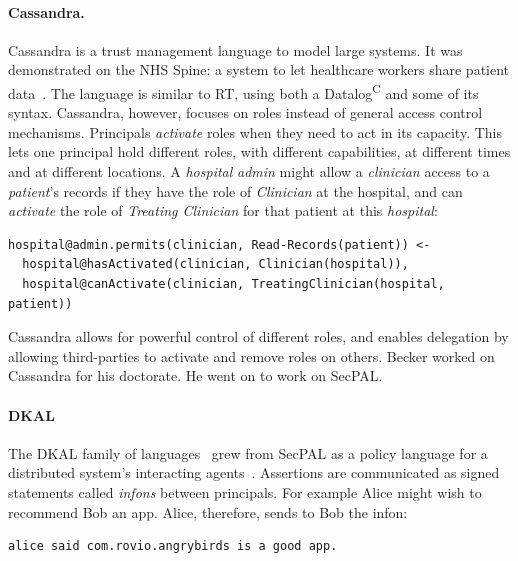 \documentclass[thesis.tex]{subfiles}
\begin{document}
\paragraph*{Cassandra.}
Cassandra is a trust management language to model large systems.
It was demonstrated on the NHS Spine: a system to let healthcare
workers share patient
data~\cite{becker_cassandra:_2004,becker_cassandra:_2004-1}.  The
language is similar to RT, using both a Datalog\textsuperscript{C} and some
of its syntax. Cassandra, however, focuses on roles instead of general access
control mechanisms.  Principals \emph{activate} roles when they need to act in its
capacity.  This lets one principal hold different roles, with
different capabilities, at different times and at different
locations.  A \emph{hospital} \emph{admin} might allow a
\emph{clinician} access to a \emph{patient}'s records if they
have the role of \emph{Clinician} at the hospital, and can
\emph{activate} the role of \emph{Treating Clinician} for that patient
at this \emph{hospital}:

\noindent\begin{minipage}{\textwidth}
\begin{lstlisting}
hospital@admin.permits(clinician, Read-Records(patient)) <-
  hospital@hasActivated(clinician, Clinician(hospital)),
  hospital@canActivate(clinician, TreatingClinician(hospital, patient))
\end{lstlisting}
\end{minipage}

Cassandra allows for powerful control of different roles, and enables
delegation by allowing third-parties to activate and remove roles
on others.  
Becker worked on Cassandra for his doctorate.  He went on to work on SecPAL.

\paragraph*{DKAL}
The DKAL family of
languages~\cite{jeannin_dkal*:_2013,gurevich_dkal:_2008,yuri_gurevich_dkal2---simplified_2009}
grew from SecPAL as a policy language for a distributed system's
interacting agents~\cite{blass_introduction_2012}. Assertions are
communicated as signed statements called \emph{infons} between
principals. For example Alice might wish to recommend Bob an
app. Alice, therefore, sends to Bob the infon:

\begin{lstlisting}
alice said com.rovio.angrybirds is a good app.
\end{lstlisting}
\end{document}

